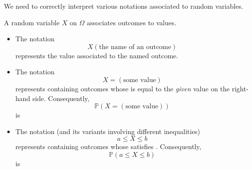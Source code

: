 \documentclass[../main.tex]{subfiles}
\begin{document}
We need to correctly interpret various notations associated to random variables.
\begin{definition} \label{def:random-variables}
  A random variable \(X\) on \(\Omega\) associates outcomes to values.

  \begin{itemize}[itemsep={2ex}]
    \item The notation 
      \[
        X(\text{the name of an outcome})
      \] 
      represents the value associated to the named outcome.
      

    \item The notation 
      \[
        X = (\text{some value})
      \] 
      represents \underline{\hspace{2in}} containing outcomes whose \underline{\hspace{2cm}} is equal to the \emph{given} value on the right-hand side. 
      Consequently, 
      \[
        \mathbb{P}(X = (\text{some value}))
      \]
      is \underline{\hspace{5in}} %

    \item The notation (and its variants involving different inequalities)
      \[
        a \le X \le b
      \]
      represents \underline{\hspace{2in}} containing outcomes whose \underline{\hspace{2cm}} satisfies \underline{\hspace{4in}}.
      Consequently,
      \[
        \mathbb{P}(a \le X \le b)
      \]
      is \underline{\hspace{5in}} %
  \end{itemize}
\end{definition}
\end{document}
